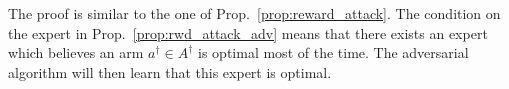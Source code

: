 The proof is similar to the one of Prop.~\ref{prop:reward_attack}. The condition on the expert in Prop.~\ref{prop:rwd_attack_adv} means that there exists an expert which believes an arm $a^{\dagger}\in A^{\dagger}$ is optimal most of the time. The adversarial algorithm will then learn that this expert is optimal. %

